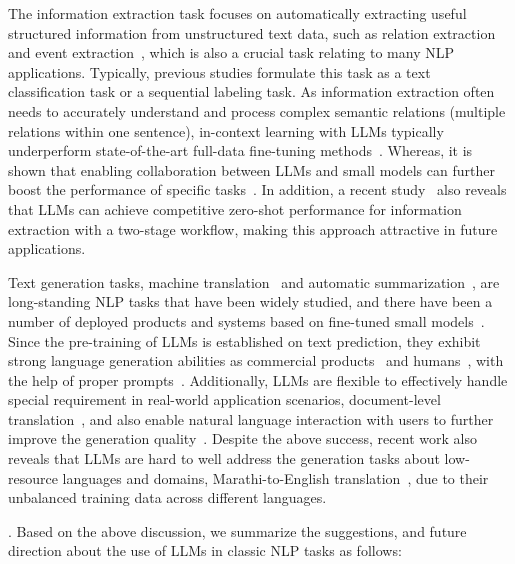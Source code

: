 The information extraction task focuses on automatically extracting useful structured information from unstructured text data, such as relation extraction~\cite{Pawar-arxiv-2017-relation} and event extraction~\cite{walker-ldc-2006-ace}, which is also a crucial task relating to many NLP applications.
Typically, previous studies formulate this task as a text classification task or a sequential labeling task.
{As information extraction often needs to accurately understand and process complex semantic relations  (multiple relations within one sentence),  in-context learning with LLMs typically underperform state-of-the-art full-data fine-tuning methods~\cite{gao-arxiv-2023-exploring,ma-arxiv-2023-Large}.}
Whereas, it is shown that enabling collaboration between LLMs and small models can further boost the performance of specific tasks~\cite{tang-arxiv-2023-does,ma-arxiv-2023-Large}. 
In addition, a recent study~\cite{wei-arxiv-2023-zero} also reveals that LLMs can achieve competitive zero-shot performance for information extraction with a two-stage workflow, making this approach attractive in future applications.


{Text generation tasks, \eg machine translation~\cite{Bahdanau-ICLR-2015-Neural} and automatic summarization~\cite{Nallapati-acl-2016-Abstractive}, are long-standing NLP tasks that have been widely studied, and there have been a number of deployed products and systems based on fine-tuned small models~\cite{Wu-arxiv-2016-Google,vaswani-CAMT-2018-tensor2tensor}.
Since the pre-training of LLMs is established on text prediction, they exhibit strong language generation abilities  as commercial products~\cite{Jiao-arxiv-2023-mt} and humans~\cite{Zhang-2023-arxiv-Benchmarking}, with the help of proper prompts~\cite{zhang-arxiv-2023-prompting,ghazvininejad-arxiv-2023-dictionary}. 
Additionally, LLMs are flexible to effectively handle special requirement in real-world application scenarios, \eg document-level translation~\cite{wang-arxiv-2023-document}, and also enable natural language interaction with users to further improve the generation quality~\cite{jiao-arxiv-2023-parrot}.
Despite the above success, recent work also reveals that LLMs are hard to well address the generation tasks about low-resource languages and domains, \eg Marathi-to-English translation~\cite{yang-arxiv-2023-bigtrans}, due to their unbalanced training data across different languages.
}


. 
{Based on the above discussion, we summarize the suggestions, and future direction about the use of LLMs in classic NLP tasks as follows:}

